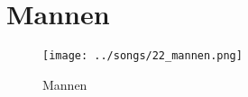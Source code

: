 \section{Mannen}



\begin{figure}[!htbp]
  \texttt{[image: ../songs/22\_mannen.png]}
  \caption{Mannen}
  \label{fig:22_mannen}
\end{figure}
